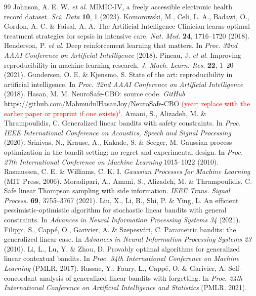 \documentclass[10pt,a4paper]{article}
\newcommand{\verify}[1]{\textcolor{red}{#1$^{\dagger}$}}
\begin{document}
{\begin{thebibliography}{99}
 Johnson, A. E. W. \emph{et al.} MIMIC-IV, a freely accessible electronic health record dataset. \emph{Sci. Data} \textbf{10}, 1 (2023).
 Komorowski, M., Celi, L. A., Badawi, O., Gordon, A. C. \& Faisal, A. A. The Artificial Intelligence Clinician learns optimal treatment strategies for sepsis in intensive care. \emph{Nat. Med.} \textbf{24}, 1716--1720 (2018).
 Henderson, P. \emph{et al.} Deep reinforcement learning that matters. In \emph{Proc. 32nd AAAI Conference on Artificial Intelligence} (2018).
 Pineau, J. \emph{et al.} Improving reproducibility in machine learning research. \emph{J. Mach. Learn. Res.} \textbf{22}, 1--20 (2021).
 Gundersen, O. E. \& Kjensmo, S. State of the art: reproducibility in artificial intelligence. In \emph{Proc. 32nd AAAI Conference on Artificial Intelligence} (2018).
 Hasan, M. M. NeuroSafe-CBO: source code. \emph{GitHub} https://github.com/MahmudulHasanJoy/NeuroSafe-CBO \verify{(year; replace with the earlier paper or preprint if one exists)}.
 Amani, S., Alizadeh, M. \& Thrampoulidis, C. Generalized linear bandits with safety constraints. In \emph{Proc. IEEE International Conference on Acoustics, Speech and Signal Processing} (2020).
 Srinivas, N., Krause, A., Kakade, S. \& Seeger, M. Gaussian process optimization in the bandit setting: no regret and experimental design. In \emph{Proc. 27th International Conference on Machine Learning} 1015--1022 (2010).
 Rasmussen, C. E. \& Williams, C. K. I. \emph{Gaussian Processes for Machine Learning} (MIT Press, 2006).
 Moradipari, A., Amani, S., Alizadeh, M. \& Thrampoulidis, C. Safe linear Thompson sampling with side information. \emph{IEEE Trans. Signal Process.} \textbf{69}, 3755--3767 (2021).
 Liu, X., Li, B., Shi, P. \& Ying, L. An efficient pessimistic-optimistic algorithm for stochastic linear bandits with general constraints. In \emph{Advances in Neural Information Processing Systems 34} (2021).
 Filippi, S., Capp\'e, O., Garivier, A. \& Szepesv\'ari, C. Parametric bandits: the generalized linear case. In \emph{Advances in Neural Information Processing Systems 23} (2010).
 Li, L., Lu, Y. \& Zhou, D. Provably optimal algorithms for generalized linear contextual bandits. In \emph{Proc. 34th International Conference on Machine Learning} (PMLR, 2017).
 Russac, Y., Faury, L., Capp\'e, O. \& Garivier, A. Self-concordant analysis of generalized linear bandits with forgetting. In \emph{Proc. 24th International Conference on Artificial Intelligence and Statistics} (PMLR, 2021).

\end{thebibliography}}
\end{document}
